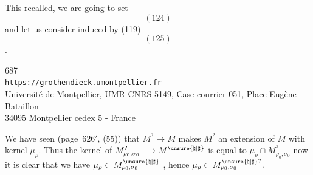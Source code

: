 This recalled, we are going to set
\[
(124)
\]
and let us consider  induced by (119)
\[
(125)
\]
.


\begin{center}
687\\
\texttt{https://grothendieck.umontpellier.fr}\\
Université de Montpellier, UMR CNRS 5149, Case courrier 051, Place Eugène Bataillon\\
34095 Montpellier cedex 5 - France
\end{center}



We have seen (page\ $626'$, (55)) that $M^?\longrightarrow M$ makes $M^?$
an extension of $M$ with kernel $\mu_\rho$.
Thus the kernel of $M_{\rho_0,\sigma_0}^?\longrightarrow
M^{\unsure{\natural|\sharp}}$ is equal to
$\mu_\rho\cap M_{\rho_0,\sigma_0}^?$
now it is clear that we have
$\mu_\rho\subset M_{\rho_0,\sigma_0}^{\unsure{\natural|\sharp}}$
,
hence $\mu_\rho\subset
M_{\rho_0,\sigma_0}^{\unsure{\natural|\sharp}?}$.

